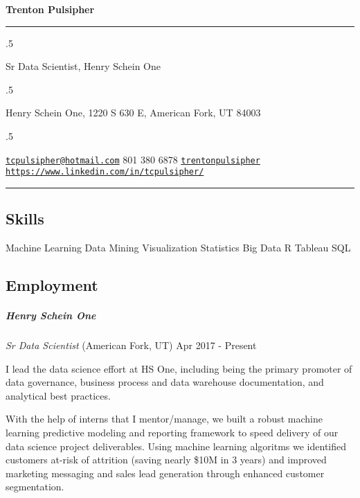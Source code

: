 \documentclass[11pt,]{article}
\let\oldsubparagraph\subparagraph
\renewcommand{\subparagraph}[1]{\oldsubparagraph{#1}\mbox{}}
\begin{document}
\centerline{\huge \bf Trenton Pulsipher}

\vspace{2 mm}

\hrule

\vspace{2 mm}

\moveleft.5\hoffset\centerline{Sr Data Scientist, Henry Schein One}
\moveleft.5\hoffset\centerline{Henry Schein One, 1220 S 630 E, American Fork, UT 84003}
\moveleft.5\hoffset\centerline{ \faEnvelopeO \hspace{1 mm} \href{mailto:}{\tt \href{mailto:tcpulsipher@hotmail.com}{\nolinkurl{tcpulsipher@hotmail.com}}} \hspace{1 mm}  \faPhone \hspace{1 mm}  801 380 6878  \hspace{1 mm}  \faGithub \hspace{1 mm} \href{http://github.com/trentonpulsipher}{\tt trentonpulsipher} \hspace{1 mm}    \faGlobe \hspace{1 mm} \href{http://\url{https://www.linkedin.com/in/tcpulsipher/}}{\tt \url{https://www.linkedin.com/in/tcpulsipher/}}   }

\vspace{2 mm}

\hrule


\subsection{Skills}\label{skills}

Machine Learning \textbar{} Data Mining \textbar{} Visualization
\textbar{} Statistics \textbar{} Big Data \textbar{} R \textbar{}
Tableau \textbar{} SQL

\subsection{Employment}\label{employment}

\subparagraph{Henry Schein One}\label{henry-schein-one}

\emph{Sr Data Scientist} (American Fork, UT) \hfill Apr 2017 - Present

I lead the data science effort at HS One, including being the primary
promoter of data governance, business process and data warehouse
documentation, and analytical best practices.

With the help of interns that I mentor/manage, we built a robust machine
learning predictive modeling and reporting framework to speed delivery
of our data science project deliverables. Using machine learning
algoritms we identified customers at-risk of attrition (saving nearly
\$10M in 3 years) and improved marketing messaging and sales lead
generation through enhanced customer segmentation.
\end{document}
